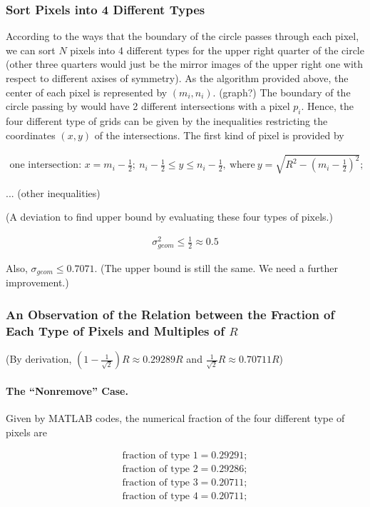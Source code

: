 \documentclass[letterpaper]{article}
\numberwithin{equation}{section} %
\numberwithin{figure}{section} %
\numberwithin{table}{section} %
\begin{document}
\subsubsection{Sort Pixels into 4 Different Types}
According to the ways that the boundary of the circle passes through each pixel, we can sort $N$ pixels into 4 different types for the upper right quarter of the circle (other three quarters would just be the mirror images of the upper right one with respect to different axises of symmetry). As the algorithm provided above, the center of each pixel is represented by $(m_i, n_i)$. (graph?) The boundary of the circle passing by would have 2 different intersections with a pixel $p_i$. Hence, the four different type of grids can be given by the inequalities restricting the coordinates $(x,y)$ of the intersections. The first kind of pixel is provided by  

\begin{align} 
\text{one intersection: } x=m_i-\frac{1}{2}; \ n_i-\frac{1}{2}\leq y \leq n_i-\frac{1}{2}, \ \text{where} \ y=\sqrt{R^2-(m_i-\frac{1}{2})^2};
\end{align}

... (other inequalities)

(A deviation to find upper bound by evaluating these four types of pixels.) 

\begin{align} 
\sigma_{geom}^2 \leq \frac{1}{2} \approx 0.5
\end{align}

Also, $\sigma_{geom} \leq 0.7071$. (The upper bound is still the same. We need a further improvement.)

\subsubsection{An Observation of the Relation between the Fraction of Each Type of Pixels and Multiples of $R$}

(By derivation, $(1-\frac{1}{\sqrt{2}})R \approx 0.29289 R$ and $\frac{1}{\sqrt{2}}R \approx 0.70711 R$)

\paragraph{The \enquote{Nonremove} Case.}
Given by MATLAB codes, the numerical fraction of the four different type of pixels are 

\begin{align} 
\text{fraction of type 1}=0.29291; \\
\text{fraction of type 2}=0.29286; \\
\text{fraction of type 3}=0.20711; \\
\text{fraction of type 4}=0.20711; 
\end{align}
\end{document}
